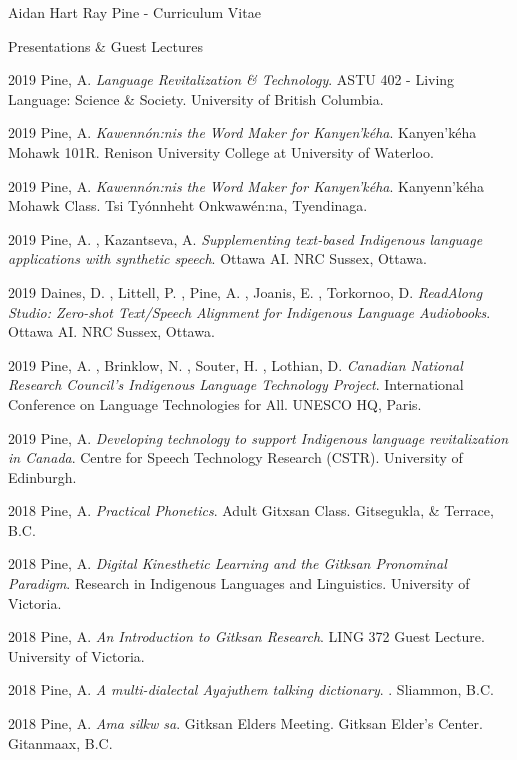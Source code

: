 \documentclass[12pt]{letter}
\begin{document}
\begin{cv}{ Aidan Hart Ray Pine  \space - \space   Curriculum Vitae}
\begin{cvlist}{Presentations \& Guest Lectures}
                    \item[2019]  Pine,  A.   \textit{Language Revitalization \& Technology}. ASTU 402 - Living Language: Science \& Society. University of British Columbia.  
                    \item[2019]  Pine,  A.   \textit{Kawenn{\'o}n:nis the Word Maker for Kanyen'k{\'e}ha}. Kanyen'k{\'e}ha Mohawk 101R. Renison University College at University of Waterloo.  
                    \item[2019]  Pine,  A.   \textit{Kawenn{\'o}n:nis the Word Maker for Kanyen'k{\'e}ha}. Kanyenn'k{\'e}ha Mohawk Class. Tsi Ty{\'o}nnheht Onkwaw{\'e}n:na, Tyendinaga.  
                    \item[2019]  Pine,  A. ,  Kazantseva,  A.   \textit{Supplementing text-based Indigenous language applications with synthetic speech}. Ottawa AI. NRC Sussex, Ottawa.  
                    \item[2019]  Daines,  D. ,  Littell,  P. ,  Pine,  A. ,  Joanis,  E. ,  Torkornoo,  D.   \textit{ReadAlong Studio: Zero-shot Text/Speech Alignment for Indigenous Language Audiobooks}. Ottawa AI. NRC Sussex, Ottawa.  
                    \item[2019]  Pine,  A. ,  Brinklow,  N. ,  Souter,  H. ,  Lothian,  D.   \textit{Canadian National Research Council's Indigenous	Language Technology Project}. International Conference on Language Technologies for All. UNESCO HQ, Paris.  
                    \item[2019]  Pine,  A.   \textit{Developing technology to support Indigenous language revitalization in Canada}. Centre for Speech Technology Research (CSTR). University of Edinburgh.  
                    \item[2018]  Pine,  A.   \textit{Practical Phonetics}. Adult Gitxsan Class. Gitsegukla, \& Terrace, B.C.  
                    \item[2018]  Pine,  A.   \textit{Digital Kinesthetic Learning and the Gitksan Pronominal Paradigm}. Research in Indigenous Languages and Linguistics. University of Victoria.  
                    \item[2018]  Pine,  A.   \textit{An Introduction to Gitksan Research}. LING 372 Guest Lecture. University of Victoria.  
                    \item[2018]  Pine,  A.   \textit{A multi-dialectal Ayajuthem talking dictionary}. . Sliammon, B.C.  
                    \item[2018]  Pine,  A.   \textit{Ama silkw sa}. Gitksan Elders Meeting. Gitksan Elder's Center. Gitanmaax, B.C.  

\end{cvlist}
\end{cv}
\end{document}
